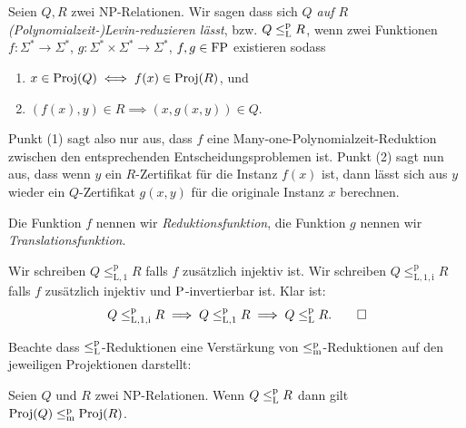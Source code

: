 \begin{definition}\label{def:levin-reduction}
    Seien $Q, R$ zwei NP-Relationen. Wir sagen dass sich \emph{$Q$ auf $R$ (Polynomialzeit-)Levin-reduzieren lässt}, bzw. $Q\leqlp R$, wenn zwei Funktionen $f:\Sigma^*\to\Sigma^*$, $g:\Sigma^*\times\Sigma^*\to\Sigma^*$, $f, g\in \FP$ existieren sodass
    \begin{enumerate}
        \item $x\in\Proj(Q) \iff f(x)\in\Proj(R)$, und
        \item $(f(x), y)\in R \implies (x, g(x,y))\in Q$.
    \end{enumerate}
    Punkt (1) sagt also nur aus, dass $f$ eine Many-one-Polynomialzeit-Reduktion zwischen den entsprechenden Entscheidungsproblemen ist.
    Punkt (2) sagt nun aus, dass wenn $y$ ein $R$-Zertifikat für die Instanz $f(x)$ ist, dann lässt sich aus $y$ wieder ein $Q$-Zertifikat $g(x,y)$ für die originale Instanz $x$ berechnen.

    Die Funktion $f$ nennen wir \emph{Reduktionsfunktion}, die Funktion $g$ nennen wir \emph{Translationsfunktion}.

    Wir schreiben $Q\leq_\mathrm{L,1}^\mathrm p R$ falls $f$ zusätzlich injektiv ist. Wir schreiben $Q\leq_\mathrm{L,1,i}^\mathrm p R$ falls $f$ zusätzlich injektiv und $\P$-invertierbar ist. Klar ist:
    \[ Q\leq_\mathrm{L,1,i}^\mathrm p R \implies Q \leq_\mathrm{L,1}^\mathrm p R \implies Q \leqlp R. \qedhere\]
\end{definition}

Beachte dass $\leqlp$-Reduktionen eine Verstärkung von $\leqmp$-Reduktionen auf den jeweiligen Projektionen darstellt:
\begin{observation}
    Seien $Q$ und $R$ zwei NP-Relationen.
    Wenn $Q\leqlp R$ dann gilt $\Proj(Q)\leqmp \Proj(R)$.
\end{observation}


